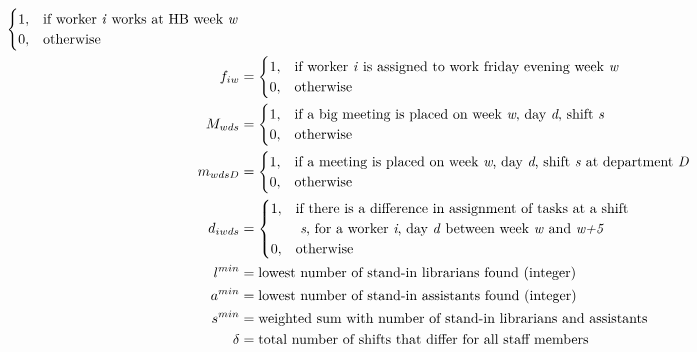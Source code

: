 \begin{align}
\begin{cases}
 		1, & \text{if worker \textit{i} works at HB week \textit{w}} \\
 		0, & \text{otherwise}
	\end{cases}
	\\
	f_{iw}&=
	\begin{cases}
 		1, & \text{if worker \textit{i} is assigned to work friday evening week \textit{w}} \\
 		0, & \text{otherwise}
	\end{cases}	
	\\
	M_{wds}&=
	\begin{cases}
	 	1, & \text{if a big meeting is placed on week \textit{w}, day \textit{d}, shift \textit{s}} \\
	 	0, & \text{otherwise}
	\end{cases}
	\\
	m_{wdsD}&=
	\begin{cases}
	 	1, & \text{if a meeting is placed on week \textit{w}, day \textit{d}, shift \textit{s} at department \textit{D}} \\
	 	0, & \text{otherwise}
	\end{cases}
	\\
	d_{iwds}&=
	\begin{cases}
	 	1, & \text{if there is a difference in assignment of tasks at a shift}\\
	 		& \text{ \textit{s}, for a worker \textit{i}, day \textit{d} between week \textit{w} and \textit{w+5}} \\
	 	0, & \text{otherwise}
	\end{cases}
	\\
	l^{min}&= \text{lowest number of stand-in librarians found (integer)} \\
	a^{min}&= \text{lowest number of stand-in assistants found (integer)} \\
	s^{min}&= \text{weighted sum with number of stand-in librarians and assistants} \\
	\delta&= \text{total number of shifts that differ for all staff members}
\end{align}



